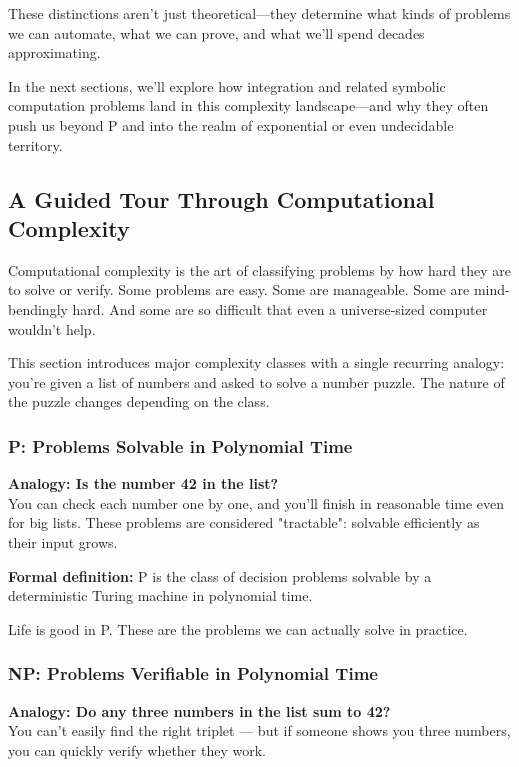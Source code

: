\noindent These distinctions aren’t just theoretical—they determine what kinds of problems we can automate, what we can prove, and what we’ll spend decades approximating.

In the next sections, we’ll explore how integration and related symbolic computation problems land in this complexity landscape—and why they often push us beyond P and into the realm of exponential or even undecidable territory.




\subsection{A Guided Tour Through Computational Complexity}

Computational complexity is the art of classifying problems by how hard they are to solve or verify. Some problems are easy. Some are manageable. Some are mind-bendingly hard. And some are so difficult that even a universe-sized computer wouldn't help.

This section introduces major complexity classes with a single recurring analogy: you're given a list of numbers and asked to solve a number puzzle. The nature of the puzzle changes depending on the class.

\subsubsection{P: Problems Solvable in Polynomial Time}

\textbf{Analogy: Is the number 42 in the list?} \\
You can check each number one by one, and you'll finish in reasonable time even for big lists. These problems are considered "tractable": solvable efficiently as their input grows.

\textbf{Formal definition:} P is the class of decision problems solvable by a deterministic Turing machine in polynomial time.

Life is good in P. These are the problems we can actually solve in practice.

\subsubsection{NP: Problems Verifiable in Polynomial Time}

\textbf{Analogy: Do any three numbers in the list sum to 42?} \\
You can't easily find the right triplet — but if someone shows you three numbers, you can quickly verify whether they work.


